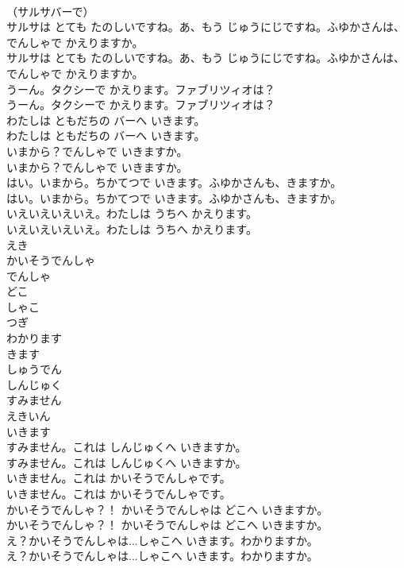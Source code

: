 \documentclass[8pt]{extreport}
\begin{document}
\begin{CJK}{UTF8}{min}
\\	（サルサバーで） 
\\	サルサは とても たのしいですね。あ、もう じゅうにじですね。ふゆかさんは、でんしゃで かえりますか。	
\\	サルサは とても たのしいですね。あ、もう じゅうにじですね。ふゆかさんは、でんしゃで かえりますか。 
\\	うーん。タクシーで かえります。ファブリツィオは？	
\\	うーん。タクシーで かえります。ファブリツィオは？ 
\\	わたしは ともだちの バーへ いきます。	
\\	わたしは ともだちの バーへ いきます。 
\\	いまから？でんしゃで いきますか。	
\\	いまから？でんしゃで いきますか。 
\\	はい。いまから。ちかてつで いきます。ふゆかさんも、きますか。	
\\	はい。いまから。ちかてつで いきます。ふゆかさんも、きますか。 
\\	いえいえいえいえ。わたしは うちへ かえります。	
\\	いえいえいえいえ。わたしは うちへ かえります。 
\\	えき
\\	かいそうでんしゃ
\\	でんしゃ
\\	どこ
\\	しゃこ
\\	つぎ
\\	わかります
\\	きます
\\	しゅうでん
\\	しんじゅく
\\	すみません
\\	えきいん
\\	いきます
\\	すみません。これは しんじゅくへ いきますか。	
\\	すみません。これは しんじゅくへ いきますか。 
\\	いきません。これは かいそうでんしゃです。	
\\	いきません。これは かいそうでんしゃです。 
\\	かいそうでんしゃ？！ かいそうでんしゃは どこへ いきますか。	
\\	かいそうでんしゃ？！ かいそうでんしゃは どこへ いきますか。 
\\	え？かいそうでんしゃは...しゃこへ いきます。わかりますか。	
\\	え？かいそうでんしゃは...しゃこへ いきます。わかりますか。 

\end{CJK}
\end{document}
